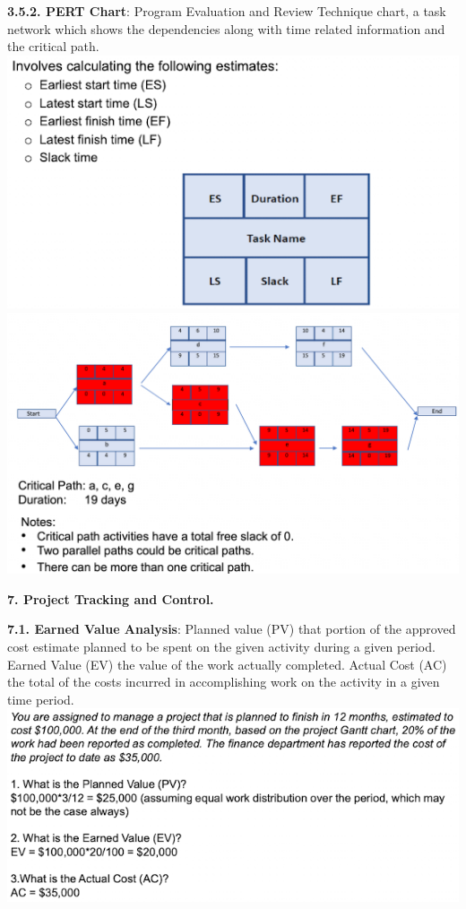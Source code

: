         \textbf{3.5.2. PERT Chart}: Program Evaluation and Review Technique chart, a task network which shows the dependencies along with time related information and the critical path.
        \includegraphics[width=\linewidth]{figs/SCR-20240606-pfyr.png}
        \includegraphics[width=\linewidth]{figs/SCR-20240606-pggc.png}

\textbf{7. Project Tracking and Control.}

    \textbf{7.1. Earned Value Analysis}: Planned value (PV) that portion of the approved cost estimate planned to be spent on the given activity during a given period. Earned Value (EV) the value of the work actually completed. Actual Cost (AC) the total of the costs incurred in accomplishing work on the activity in a given time period.
    \includegraphics[width=\linewidth]{figs/SCR-20240606-pidd.png}

